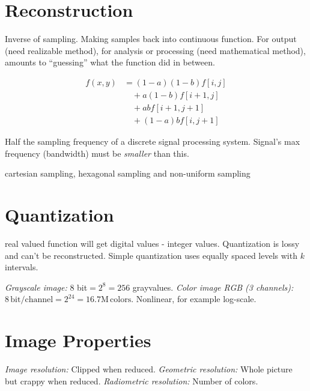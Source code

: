 \section{Reconstruction}
Inverse of sampling. Making samples back into continuous function. For output (need realizable method), for analysis or processing (need mathematical method), amounts to ``guessing'' what the function did in between.
\begin{compactdesc}
	\item[\lp{Bilinear interpolation}]
		\begin{align*}
			f(x,y)&=(1-a)(1-b)f[i,j]\\
			&\quad+a(1-b)f[i+1,j]\\
			&\quad+abf[i+1,j+1]\\
			&\quad+(1-a)bf[i,j+1]
		\end{align*}
	\item[\lp{Nyquist frequency}] Half the sampling frequency of a discrete signal processing system. Signal's max frequency (bandwidth) must be \emph{smaller} than this.
	\item[\lp{sampling grids}] cartesian sampling, hexagonal sampling and non-uniform sampling
\end{compactdesc}
\section{Quantization}
real valued function will get digital values - integer values. Quantization is lossy and can't be reconstructed. Simple quantization uses equally spaced levels with $k$ intervals.
\begin{compactdesc}
\item[\lp{usual quantization intervals}] \emph{Grayscale image:} $8$ bit$=2^{8}=256$ grayvalues. \emph{Color image RGB (3 channels):} $8\,\text{bit}/\text{channel}=2^{24}=16.7\text{M}\,\text{colors}$. Nonlinear, for example log-scale.
\end{compactdesc}
\section{Image Properties}
\emph{Image resolution:} Clipped when reduced. \emph{Geometric resolution:} Whole picture but crappy when reduced. \emph{Radiometric resolution:} Number of colors.
